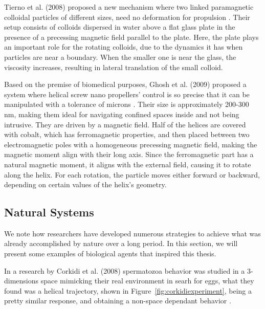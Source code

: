 Tierno et al. (2008) proposed a new mechanism where two linked paramagnetic colloidal particles of different sizes, need no deformation for propulsion \cite{tierno2008controlled}. Their setup consists of colloids dispersed in water above a flat glass plate in the presence of a precessing magnetic field parallel to the plate. Here, the plate plays an important role for the rotating colloids, due to the dynamics it has when particles are near a boundary. When the smaller one is near the glass, the viscosity increases, resulting in lateral translation of the small colloid.


Based on the premise of biomedical purposes, Ghosh et al. (2009) proposed a system where helical screw nano propellers' control is so precise that it can be manipulated with a tolerance of microns \cite{ghosh2009controlled}. Their size is approximately 200-300 nm, making them ideal for navigating confined spaces inside and not being intrusive. They are driven by a magnetic field. Half of the helices are covered with cobalt, which has ferromagnetic properties, and then placed between two electromagnetic poles with a homogeneous precessing magnetic field, making the magnetic moment align with their long axis. Since the ferromagnetic part has a natural magnetic moment, it aligns with the external field, causing it to rotate along the helix. For each rotation, the particle moves either forward or backward, depending on certain values of the helix's geometry. 

\subsection{Natural Systems}

We note how researchers have developed numerous strategies to achieve what was already accomplished by nature over a long period. In this section, we will present some examples of biological agents that inspired this thesis.

 In a research by Corkidi et al. (2008) spermatozoa behavior was studied in a 3-dimensions space mimicking their real environment in searh for eggs, what they found was a helical trajectory, shown in Figure~\ref{fig:corkidiexperiment}, being a pretty similar response, and obtaining a non-space dependant behavior \cite{corkidi2008tracking}. 

